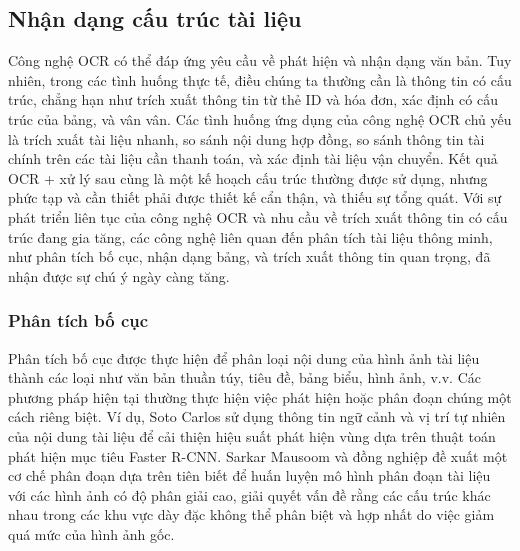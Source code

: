 \subsection{Nhận dạng cấu trúc tài liệu}
Công nghệ OCR có thể đáp ứng yêu cầu về phát hiện và nhận dạng văn bản. Tuy nhiên, trong các tình huống thực tế, điều chúng ta thường cần là thông tin có cấu trúc, chẳng hạn như trích xuất thông tin từ thẻ ID và hóa đơn, xác định có cấu trúc của bảng, và vân vân. Các tình huống ứng dụng của công nghệ OCR chủ yếu là trích xuất tài liệu nhanh, so sánh nội dung hợp đồng, so sánh thông tin tài chính trên các tài liệu cần thanh toán, và xác định tài liệu vận chuyển. Kết quả OCR + xử lý sau cùng là một kế hoạch cấu trúc thường được sử dụng, nhưng phức tạp và cần thiết phải được thiết kế cẩn thận, và thiếu sự tổng quát. Với sự phát triển liên tục của công nghệ OCR và nhu cầu về trích xuất thông tin có cấu trúc đang gia tăng, các công nghệ liên quan đến phân tích tài liệu thông minh, như phân tích bố cục, nhận dạng bảng, và trích xuất thông tin quan trọng, đã nhận được sự chú ý ngày càng tăng.

\subsubsection*{Phân tích bố cục}
Phân tích bố cục được thực hiện để phân loại nội dung của hình ảnh tài liệu thành các loại như văn bản thuần túy, tiêu đề, bảng biểu, hình ảnh, v.v. Các phương pháp hiện tại thường thực hiện việc phát hiện hoặc phân đoạn chúng một cách riêng biệt. Ví dụ, Soto Carlos sử dụng thông tin ngữ cảnh và vị trí tự nhiên của nội dung tài liệu để cải thiện hiệu suất phát hiện vùng dựa trên thuật toán phát hiện mục tiêu Faster R-CNN. Sarkar Mausoom và đồng nghiệp đề xuất một cơ chế phân đoạn dựa trên tiên biết để huấn luyện mô hình phân đoạn tài liệu với các hình ảnh có độ phân giải cao, giải quyết vấn đề rằng các cấu trúc khác nhau trong các khu vực dày đặc không thể phân biệt và hợp nhất do việc giảm quá mức của hình ảnh gốc.

